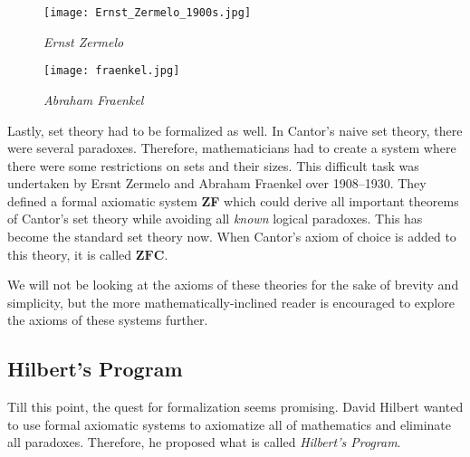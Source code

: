 \documentclass[a4paper, 12pt]{article}
\theoremstyle{definition}
\begin{document}
    \begin{figure}[h]
        \centering 
        \begin{minipage}{0.45\textwidth}
            \centering 
            \texttt{[image: Ernst\_Zermelo\_1900s.jpg]}
            \caption[ernie]{\textit{Ernst Zermelo}\footnotemark}
        \end{minipage}
        \begin{minipage}{0.45\textwidth}
            \centering 
            \texttt{[image: fraenkel.jpg]}
            \caption[frankel]{\textit{Abraham Fraenkel}\footnotemark}
        \end{minipage}
    \end{figure}
    Lastly, set theory had to be formalized as well. In Cantor's naive set theory, there were several paradoxes. Therefore, 
    mathematicians had to create a system where there were some restrictions on sets and their sizes. This difficult task was 
    undertaken by Ersnt Zermelo and Abraham Fraenkel over 1908--1930. They defined a formal axiomatic system \textbf{ZF} which 
    could derive all important theorems of Cantor's set theory while avoiding all \textit{known} logical paradoxes. This has become 
    the standard set theory now. When Cantor's axiom of choice is added to this theory, it is called $\mathbf{ZFC}$. 
    
    We will not be looking at the axioms of these theories for the sake of brevity and simplicity, but the more mathematically-inclined reader 
    is encouraged to explore the axioms of these systems further. 

    \subsection*{Hilbert's Program}
    
    Till this point, the quest for formalization seems promising. David Hilbert wanted to use formal axiomatic systems to 
    axiomatize all of mathematics and eliminate all paradoxes. Therefore, he proposed what is called \textit{Hilbert's Program}.
    \vspace{-1 em}
\end{document}
